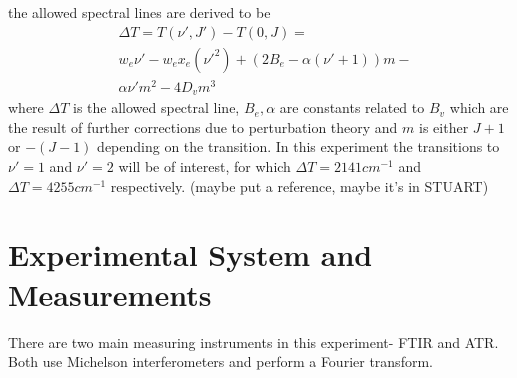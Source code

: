\documentclass[reprint,amsmath,amssymb,aps, prl]{revtex4-2}
\begin{document}
the allowed spectral lines are derived to be
\begin{equation} \label{eq:CO_DiffPeturbEnrg}
\begin{split}
& \Delta T =T(\nu ',J')-T(0,J)=\\
& w_{e}\nu' -w_{e}x_{e}(\nu'^{2})+(2B_{e}-\alpha(\nu'+1))m-\\
& \alpha\nu'm^2-4D_{v}m^{3}
\end{split}
\end{equation}
where $\Delta T$ is the allowed spectral line, $B_{e},\alpha $ are constants related to $B_{v}$  which are the result of further corrections due to perturbation theory and $m$ is either $J+1$ or $-(J-1)$  depending on the transition. In this experiment the transitions to $\nu'=1$ and $\nu' =2$ will be of interest, for which $\Delta T=2141cm^{-1}$ and $\Delta T = 4255 cm^{-1}$ respectively. (maybe put a reference, maybe it's in STUART)


\section{Experimental System and Measurements}
There are two main measuring instruments in this experiment- FTIR and ATR. Both use Michelson interferometers and perform a Fourier transform.
\end{document}
